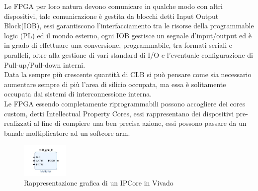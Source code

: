 Le FPGA per loro natura devono comunicare in qualche modo con altri dispositivi, tale comunicazione è gestita da blocchi detti Input Output Block(IOB), essi garantiscono l'interfacciamento tra le risorse della programmable logic (PL) ed il mondo esterno, ogni IOB gestisce un segnale d'input/output ed è in grado di effettuare una conversione, programmabile, tra formati seriali e paralleli, oltre alla gestione di vari standard di I/O e l'eventuale configurazione di Pull-up/Pull-down interni.\\
Data la sempre più crescente quantità di CLB si può pensare come sia necessario aumentare sempre di più l'area di silicio occupata, ma essa è solitamente occupata dai sistemi di interconnessione interna.\\
Le FPGA essendo completamente riprogrammabili possono accogliere dei cores custom, detti Intellectual Property Cores, essi rappresentano dei dispositivi pre-realizzati al fine di compiere una ben precisa azione, essi possono passare da un banale moltiplicatore ad un softcore arm.
\begin{figure}[h]
\centering
\includegraphics[width=0.2\textwidth]{images/IPcores.jpg}
\caption{Rappresentazione grafica di un IPCore in Vivado}
\end{figure}
